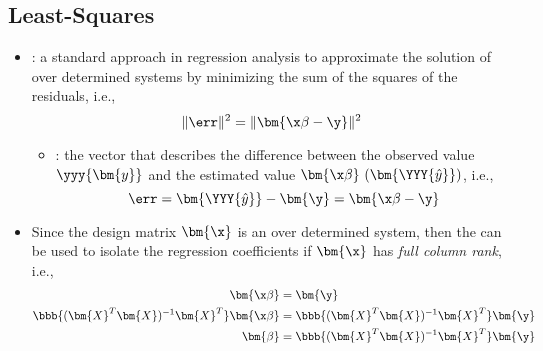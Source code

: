 \begin{itemize}
  \subsection{Least-Squares}
  \begin{itemize}
    \item {}: a standard approach in regression analysis to approximate the solution of over determined systems by minimizing the sum of the squares of the residuals, i.e.,
    \[%
    \| \err \|^2 = \| \bm{\x\beta - \y}\|^2
    \]%
    \begin{itemize}
      \item {}: the vector that describes the difference{} between the observed value~\(\yyy{\bm{y}}\) and the estimated value \(\bm{\x\beta}~(\bm{\YYY{\hat{y}}})\), i.e.,
      \[%
      \err = \bm{\YYY{\hat{y}}} - \bm{\y} = \bm{\x\beta - \y}
      \]%
    \end{itemize}
  \item Since the design matrix \(\bm{\x}\) is an over determined system, then the  can be used to isolate the regression coefficients if \(\bm{\x}\) has \emph{full column rank}, i.e.,
  \begin{align*}
    \bm{\x\beta} &= \bm{\y} \\
    \bbb{(\bm{X}^T \bm{X})^{-1} \bm{X}^T} \bm{\x\beta} &= \bbb{(\bm{X}^T \bm{X})^{-1} \bm{X}^T} \bm{\y} \\
    \bm{\beta} &= \bbb{(\bm{X}^T \bm{X})^{-1} \bm{X}^T} \bm{\y}
  \end{align*}
  \end{itemize}


\end{itemize}
